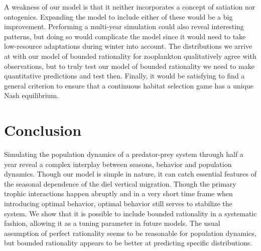 A weakness of our model is that it neither incorporates a concept of satiation nor ontogenics. Expanding the model to include either of these would be a big improvement. Performing a multi-year simulation could also reveal interesting patterns, but doing so would complicate the model since it would need to take low-resource adaptations during winter into account. The distributions we arrive at with our model of bounded rationality for zooplankton qualitatively agree with observations, but to truly test our model of bounded rationality we need to make quantitative predictions and test then. Finally, it would be satisfying to find a general criterion to ensure that a continuous habitat selection game has a unique Nash equilibrium.


\section{Conclusion} %
Simulating the population dynamics of a predator-prey system through half a year reveal a complex interplay between seasons, behavior and population dynamics. Though our model is simple in nature, it can catch essential features of the seasonal dependence of the diel vertical migration. Though the primary trophic interactions happen abruptly and in a very short time frame when introducing optimal behavior, optimal behavior still serves to stabilize the system.
We show that it is possible to include bounded rationality in a systematic fashion, allowing it as a tuning parameter in future models. The usual assumption of perfect rationality seems to be reasonable for population dynamics, but bounded rationality appears to be better at predicting specific distributions.

